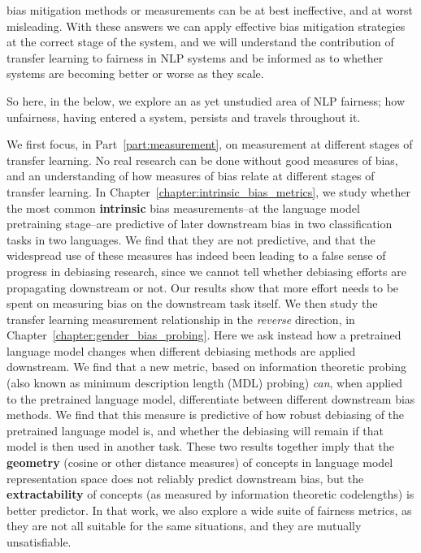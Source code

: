 bias mitigation methods or measurements can be at best ineffective, and at worst misleading. With these answers we can apply effective bias mitigation strategies at the correct stage of the system, and we will understand the contribution of transfer learning to fairness in NLP systems and be informed as to whether systems are becoming better or worse as they scale. 

So here, in the below, we explore an as yet unstudied area of NLP fairness; how unfairness, having entered a system, persists and travels throughout it. 

We first focus, in Part~\ref{part:measurement}, on measurement at different stages of transfer learning. No real research can be done without good measures of bias, and an understanding of how measures of bias relate at different stages of transfer learning. In Chapter~\ref{chapter:intrinsic_bias_metrics}, we study whether the most common \textbf{intrinsic} bias measurements--at the language model pretraining stage--are predictive of later downstream bias in two classification tasks in two languages. We find that they are not predictive, and that the widespread use of these measures has indeed been leading to a false sense of progress in debiasing research, since we cannot tell whether debiasing efforts are propagating downstream or not. Our results show that more effort needs to be spent on measuring bias on the downstream task itself. We then study the transfer learning measurement relationship in the \textit{reverse} direction, in Chapter~\ref{chapter:gender_bias_probing}. Here we ask instead how a pretrained language model changes when different debiasing methods are applied downstream. We find that a new metric, based on information theoretic probing (also known as minimum description length (MDL) probing) \citep{} \textit{can}, when applied to the pretrained language model, differentiate between different downstream bias methods. We find that this measure is predictive of how robust debiasing of the pretrained language model is, and whether the debiasing will remain if that model is then used in another task. These two results together imply that the \textbf{geometry} (cosine or other distance measures) of concepts in language model representation space does not reliably predict downstream bias, but the \textbf{extractability} of concepts (as measured by information theoretic codelengths) is better predictor. In that work, we also explore a wide suite of fairness metrics, as they are not all suitable for the same situations, and they are mutually unsatisfiable.


